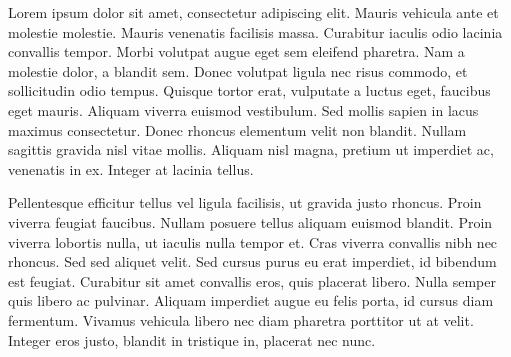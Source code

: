 
\begin{sammanfattning}

Lorem ipsum dolor sit amet, consectetur adipiscing elit. Mauris vehicula ante et molestie molestie. Mauris venenatis facilisis massa. Curabitur iaculis odio lacinia convallis tempor. Morbi volutpat augue eget sem eleifend pharetra. Nam a molestie dolor, a blandit sem. Donec volutpat ligula nec risus commodo, et sollicitudin odio tempus. Quisque tortor erat, vulputate a luctus eget, faucibus eget mauris. Aliquam viverra euismod vestibulum. Sed mollis sapien in lacus maximus consectetur. Donec rhoncus elementum velit non blandit. Nullam sagittis gravida nisl vitae mollis. Aliquam nisl magna, pretium ut imperdiet ac, venenatis in ex. Integer at lacinia tellus.

Pellentesque efficitur tellus vel ligula facilisis, ut gravida justo rhoncus. Proin viverra feugiat faucibus. Nullam posuere tellus aliquam euismod blandit. Proin viverra lobortis nulla, ut iaculis nulla tempor et. Cras viverra convallis nibh nec rhoncus. Sed sed aliquet velit. Sed cursus purus eu erat imperdiet, id bibendum est feugiat. Curabitur sit amet convallis eros, quis placerat libero. Nulla semper quis libero ac pulvinar. Aliquam imperdiet augue eu felis porta, id cursus diam fermentum. Vivamus vehicula libero nec diam pharetra porttitor ut at velit. Integer eros justo, blandit in tristique in, placerat nec nunc. 

\end{sammanfattning}


